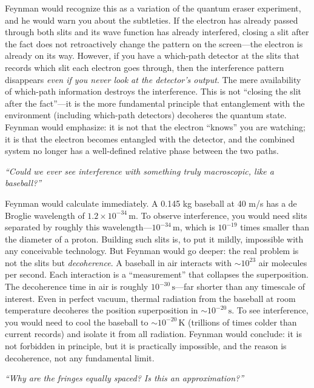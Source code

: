 Feynman would recognize this as a variation of the quantum eraser experiment, and he would warn you about the subtleties. If the electron has already passed through both slits and its wave function has already interfered, closing a slit after the fact does not retroactively change the pattern on the screen---the electron is already on its way. However, if you have a which-path detector at the slits that records which slit each electron goes through, then the interference pattern disappears \emph{even if you never look at the detector's output}. The mere availability of which-path information destroys the interference. This is not ``closing the slit after the fact''---it is the more fundamental principle that entanglement with the environment (including which-path detectors) decoheres the quantum state. Feynman would emphasize: it is not that the electron ``knows'' you are watching; it is that the electron becomes entangled with the detector, and the combined system no longer has a well-defined relative phase between the two paths.

\textit{``Could we ever see interference with something truly macroscopic, like a baseball?''}

Feynman would calculate immediately. A 0.145 kg baseball at 40 m/s has a de Broglie wavelength of $1.2\times 10^{-34}\,\text{m}$. To observe interference, you would need slits separated by roughly this wavelength---$10^{-34}\,\text{m}$, which is $10^{-19}$ times smaller than the diameter of a proton. Building such slits is, to put it mildly, impossible with any conceivable technology. But Feynman would go deeper: the real problem is not the slits but \emph{decoherence}. A baseball in air interacts with $\sim 10^{23}$ air molecules per second. Each interaction is a ``measurement'' that collapses the superposition. The decoherence time in air is roughly $10^{-30}\,\text{s}$---far shorter than any timescale of interest. Even in perfect vacuum, thermal radiation from the baseball at room temperature decoheres the position superposition in $\sim 10^{-20}\,\text{s}$. To see interference, you would need to cool the baseball to $\sim 10^{-20}\,\text{K}$ (trillions of times colder than current records) and isolate it from all radiation. Feynman would conclude: it is not forbidden in principle, but it is practically impossible, and the reason is decoherence, not any fundamental limit.

\textit{``Why are the fringes equally spaced? Is this an approximation?''}

